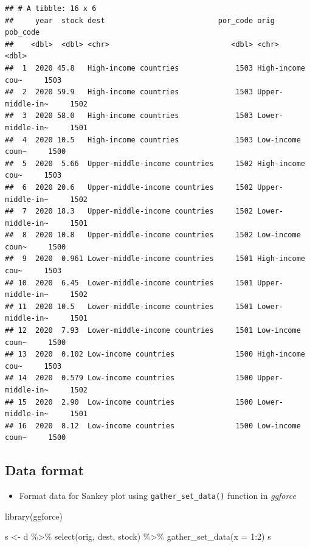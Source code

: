 \documentclass[
]{book}
\newenvironment{Shaded}{\begin{snugshade}}{\end{snugshade}}
\newcommand{\AttributeTok}[1]{\textcolor[rgb]{0.77,0.63,0.00}{#1}}
\newcommand{\DecValTok}[1]{\textcolor[rgb]{0.00,0.00,0.81}{#1}}
\newcommand{\FunctionTok}[1]{\textcolor[rgb]{0.00,0.00,0.00}{#1}}
\newcommand{\NormalTok}[1]{#1}
\newcommand{\OtherTok}[1]{\textcolor[rgb]{0.56,0.35,0.01}{#1}}
\newcommand{\SpecialCharTok}[1]{\textcolor[rgb]{0.00,0.00,0.00}{#1}}
\providecommand{\tightlist}{%
  \setlength{\itemsep}{0pt}\setlength{\parskip}{0pt}}
\begin{document}
\begin{verbatim}
## # A tibble: 16 x 6
##     year  stock dest                          por_code orig             pob_code
##    <dbl>  <dbl> <chr>                            <dbl> <chr>               <dbl>
##  1  2020 45.8   High-income countries             1503 High-income cou~     1503
##  2  2020 59.9   High-income countries             1503 Upper-middle-in~     1502
##  3  2020 58.0   High-income countries             1503 Lower-middle-in~     1501
##  4  2020 10.5   High-income countries             1503 Low-income coun~     1500
##  5  2020  5.66  Upper-middle-income countries     1502 High-income cou~     1503
##  6  2020 20.6   Upper-middle-income countries     1502 Upper-middle-in~     1502
##  7  2020 18.3   Upper-middle-income countries     1502 Lower-middle-in~     1501
##  8  2020 10.8   Upper-middle-income countries     1502 Low-income coun~     1500
##  9  2020  0.961 Lower-middle-income countries     1501 High-income cou~     1503
## 10  2020  6.45  Lower-middle-income countries     1501 Upper-middle-in~     1502
## 11  2020 10.5   Lower-middle-income countries     1501 Lower-middle-in~     1501
## 12  2020  7.93  Lower-middle-income countries     1501 Low-income coun~     1500
## 13  2020  0.102 Low-income countries              1500 High-income cou~     1503
## 14  2020  0.579 Low-income countries              1500 Upper-middle-in~     1502
## 15  2020  2.90  Low-income countries              1500 Lower-middle-in~     1501
## 16  2020  8.12  Low-income countries              1500 Low-income coun~     1500
\end{verbatim}

\hypertarget{data-format-1}{%
\subsection{Data format}\label{data-format-1}}

\begin{itemize}
\tightlist
\item
  Format data for Sankey plot using \texttt{gather\_set\_data()} function in \emph{ggforce}
\end{itemize}

\begin{Shaded}
\begin{Highlighting}[]
\FunctionTok{library}\NormalTok{(ggforce)}

\NormalTok{s }\OtherTok{\textless{}{-}}\NormalTok{ d }\SpecialCharTok{\%\textgreater{}\%}
  \FunctionTok{select}\NormalTok{(orig, dest, stock) }\SpecialCharTok{\%\textgreater{}\%}
  \FunctionTok{gather\_set\_data}\NormalTok{(}\AttributeTok{x =} \DecValTok{1}\SpecialCharTok{:}\DecValTok{2}\NormalTok{)}
\NormalTok{s}
\end{Highlighting}
\end{Shaded}
\end{document}
